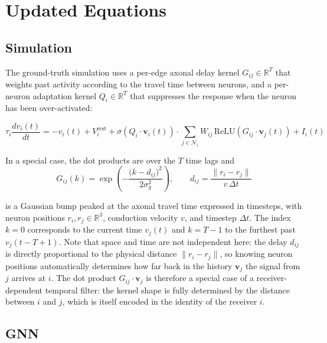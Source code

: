 \documentclass[11pt]{article}
\begin{document}
\section{Updated Equations}

\subsection*{Simulation}

The ground-truth simulation uses a per-edge axonal delay kernel
$G_{ij} \in \mathbb{R}^T$ that weights past activity according to the
travel time between neurons, and a per-neuron adaptation kernel
$Q_i \in \mathbb{R}^T$ that suppresses the response when the neuron
has been over-activated:

\begin{equation}
\boxed{
\tau_i\frac{dv_i(t)}{dt} = -v_i(t) + V_i^{\text{rest}}
+ \sigma\!\left(Q_i \cdot \mathbf{v}_i(t)\right)
\cdot \sum_{j\in\mathcal{N}_i} W_{ij}\,
  \mathrm{ReLU}\!\left(G_{ij} \cdot \mathbf{v}_j(t)\right)
+ I_i(t)
}
\label{eq:sim_new}
\end{equation}

In a special case, the dot products are over the $T$ time lags and
\begin{equation}
G_{ij}(k) = \exp\!\left(-\frac{\bigl(k - d_{ij}\bigr)^2}{2\sigma_g^2}\right),
\qquad d_{ij} = \frac{\|r_i - r_j\|}{v\,\Delta t}
\end{equation}

is a Gaussian bump peaked at the axonal travel time expressed in timesteps,
with neuron positions $r_i, r_j \in \mathbb{R}^3$, conduction velocity $v$,
and timestep $\Delta t$. The index $k=0$ corresponds to the current time
$v_j(t)$ and $k=T-1$ to the furthest past $v_j(t-T+1)$.
Note that space and time are not independent here: the delay $d_{ij}$
is directly proportional to the physical distance $\|r_i - r_j\|$,
so knowing neuron positions automatically determines how far back in
the history $\mathbf{v}_j$ the signal from $j$ arrives at $i$.
The dot product $G_{ij} \cdot \mathbf{v}_j$ is therefore a special case
of a receiver-dependent temporal filter: the kernel shape is fully
determined by the distance between $i$ and $j$, which is itself encoded
in the identity of the receiver $i$.

\subsection*{GNN}
\end{document}

